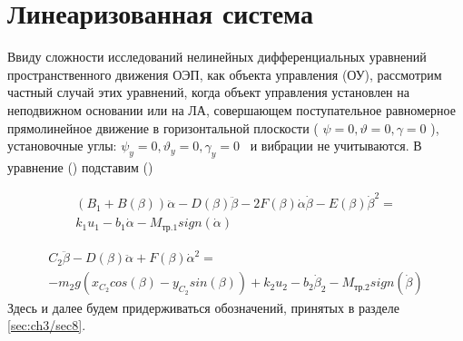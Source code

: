 {\section{Линеаризованная система} \label{ch:ch3/sect10}

Ввиду сложности исследований нелинейных дифференциальных уравнений пространственного движения ОЭП, как объекта управления (ОУ), рассмотрим частный случай этих уравнений, когда объект управления установлен на неподвижном основании или на ЛА, совершающем поступательное равномерное прямолинейное движение в горизонтальной плоскости ( \( \psi =0, \vartheta =0, \gamma =0 \) ), установочные углы: \( \psi _{y}=0, \vartheta _{y}=0, \gamma _{y}=0 \) \ и вибрации не учитываются. В уравнение () подставим ()

\begin{equation}%
\label{eq:p3:50}
\begin{multlined}
\left( B_{1}+B \left( \beta \right) \right) \ddot \alpha -D \left( \beta \right) \ddot \beta -2F \left( \beta \right) \dot \alpha \dot \beta -E \left( \beta \right) \dot \beta ^{2}=\\
k_{1}u_{1}-b_{1} \dot \alpha -M_{\textit{тр.1}}sign \left( \dot \alpha \right) 
\end{multlined}
\end{equation}

\begin{equation}%
\label{eq:p3:51}
\begin{multlined}
C_{2} \ddot \beta -D \left( \beta \right) \ddot \alpha +F \left( \beta \right) \dot \alpha ^{2}=\\
-m_{2}g \left( 
x_{C_{2}}cos \left( \beta \right) -
y_{C_{2}}sin \left( \beta \right) 
\right) 
+k_{2}u_{2}-
b_{2} \dot \beta _{2}-M_{\textit{тр.2}}sign \left( \dot \beta \right) 
\end{multlined}
\end{equation}
Здесь и далее будем придерживаться обозначений, принятых в разделе \ref{sec:ch3/sec8}. 

}
